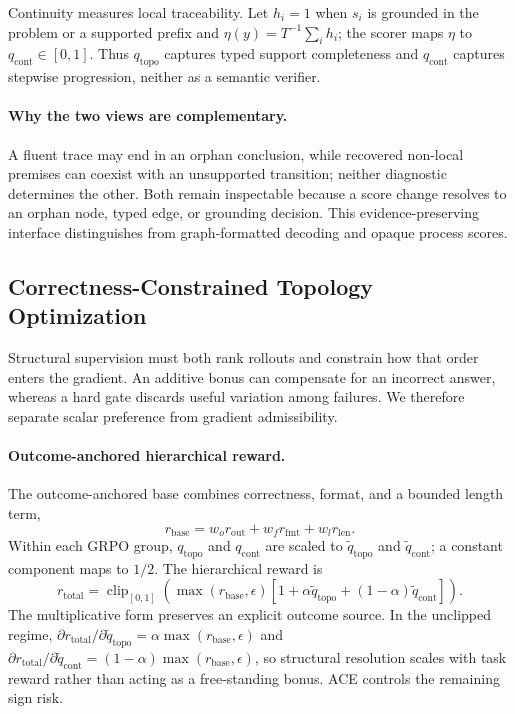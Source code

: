 Continuity measures local traceability. Let $h_i=1$ when $s_i$ is grounded in the problem or a supported prefix and $\eta(y)=T^{-1}\sum_i h_i$; the scorer maps $\eta$ to $q_{\mathrm{cont}}\in[0,1]$. Thus $q_{\mathrm{topo}}$ captures typed support completeness and $q_{\mathrm{cont}}$ captures stepwise progression, neither as a semantic verifier.

\paragraph{Why the two views are complementary.}
A fluent trace may end in an orphan conclusion, while recovered non-local premises can coexist with an unsupported transition; neither diagnostic determines the other. Both remain inspectable because a score change resolves to an orphan node, typed edge, or grounding decision. This evidence-preserving interface distinguishes \method from graph-formatted decoding and opaque process scores.

\subsection{Correctness-Constrained Topology Optimization}
\label{sec:post_training}

Structural supervision must both rank rollouts and constrain how that order enters the gradient. An additive bonus can compensate for an incorrect answer, whereas a hard gate discards useful variation among failures. We therefore separate scalar preference from gradient admissibility.

\paragraph{Outcome-anchored hierarchical reward.}
The outcome-anchored base combines correctness, format, and a bounded length term,
\begin{equation}
\label{eq:rbase}
r_{\mathrm{base}}=w_o r_{\mathrm{out}}+w_f r_{\mathrm{fmt}}+w_l r_{\mathrm{len}}.
\end{equation}
Within each GRPO group, $q_{\mathrm{topo}}$ and $q_{\mathrm{cont}}$ are scaled to $\widetilde q_{\mathrm{topo}}$ and $\widetilde q_{\mathrm{cont}}$; a constant component maps to $1/2$. The hierarchical reward is
\begin{equation}
\label{eq:r_total}
r_{\mathrm{total}}=\operatorname{clip}_{[0,1]}\!\left(
\max(r_{\mathrm{base}},\epsilon)
\left[1+\alpha\widetilde q_{\mathrm{topo}}+(1-\alpha)\widetilde q_{\mathrm{cont}}\right]\right).
\end{equation}
The multiplicative form preserves an explicit outcome source. In the unclipped regime,
$\partial r_{\mathrm{total}}/\partial\widetilde q_{\mathrm{topo}}=\alpha\max(r_{\mathrm{base}},\epsilon)$ and
$\partial r_{\mathrm{total}}/\partial\widetilde q_{\mathrm{cont}}=(1-\alpha)\max(r_{\mathrm{base}},\epsilon)$, so structural resolution scales with task reward rather than acting as a free-standing bonus. ACE controls the remaining sign risk.

